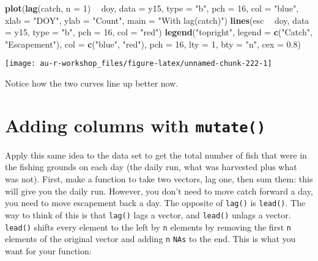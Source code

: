 \documentclass[]{book}
\newenvironment{Shaded}{\begin{snugshade}}{\end{snugshade}}
\newcommand{\KeywordTok}[1]{\textcolor[rgb]{0.13,0.29,0.53}{\textbf{#1}}}
\newcommand{\DataTypeTok}[1]{\textcolor[rgb]{0.13,0.29,0.53}{#1}}
\newcommand{\DecValTok}[1]{\textcolor[rgb]{0.00,0.00,0.81}{#1}}
\newcommand{\FloatTok}[1]{\textcolor[rgb]{0.00,0.00,0.81}{#1}}
\newcommand{\StringTok}[1]{\textcolor[rgb]{0.31,0.60,0.02}{#1}}
\newcommand{\OperatorTok}[1]{\textcolor[rgb]{0.81,0.36,0.00}{\textbf{#1}}}
\newcommand{\NormalTok}[1]{#1}
\theoremstyle{definition}
\theoremstyle{definition}
\theoremstyle{definition}
\theoremstyle{remark}
\begin{document}
\begin{Shaded}
\begin{Highlighting}[]
\KeywordTok{plot}\NormalTok{(}\KeywordTok{lag}\NormalTok{(catch, }\DataTypeTok{n =} \DecValTok{1}\NormalTok{) }\OperatorTok{~}\StringTok{ }\NormalTok{doy, }\DataTypeTok{data =}\NormalTok{ y15, }\DataTypeTok{type =} \StringTok{"b"}\NormalTok{, }\DataTypeTok{pch =} \DecValTok{16}\NormalTok{, }\DataTypeTok{col =} \StringTok{"blue"}\NormalTok{,}
     \DataTypeTok{xlab =} \StringTok{"DOY"}\NormalTok{, }\DataTypeTok{ylab =} \StringTok{"Count"}\NormalTok{, }\DataTypeTok{main =} \StringTok{"With lag(catch)"}\NormalTok{)}
\KeywordTok{lines}\NormalTok{(esc }\OperatorTok{~}\StringTok{ }\NormalTok{doy, }\DataTypeTok{data =}\NormalTok{ y15, }\DataTypeTok{type =} \StringTok{"b"}\NormalTok{, }\DataTypeTok{pch =} \DecValTok{16}\NormalTok{, }\DataTypeTok{col =} \StringTok{"red"}\NormalTok{)}
\KeywordTok{legend}\NormalTok{(}\StringTok{"topright"}\NormalTok{, }\DataTypeTok{legend =} \KeywordTok{c}\NormalTok{(}\StringTok{"Catch"}\NormalTok{, }\StringTok{"Escapement"}\NormalTok{),}
       \DataTypeTok{col =} \KeywordTok{c}\NormalTok{(}\StringTok{"blue"}\NormalTok{, }\StringTok{"red"}\NormalTok{), }\DataTypeTok{pch =} \DecValTok{16}\NormalTok{, }\DataTypeTok{lty =} \DecValTok{1}\NormalTok{, }\DataTypeTok{bty =} \StringTok{"n"}\NormalTok{, }\DataTypeTok{cex =} \FloatTok{0.8}\NormalTok{)}
\end{Highlighting}
\end{Shaded}

\begin{center}\texttt{[image: au-r-workshop\_files/figure-latex/unnamed-chunk-222-1]} \end{center}

Notice how the two curves line up better now.

\section{\texorpdfstring{Adding columns with
\texttt{mutate()}}{Adding columns with mutate()}}\label{adding-columns-with-mutate}

Apply this same idea to the data set to get the total number of fish
that were in the fishing grounds on each day (the daily run, what was
harvested plus what was not). First, make a function to take two
vectors, lag one, then sum them: this will give you the daily run.
However, you don't need to move catch forward a day, you need to move
escapement back a day. The opposite of \texttt{lag()} is
\texttt{lead()}. The way to think of this is that \texttt{lag()} lags a
vector, and \texttt{lead()} unlags a vector. \texttt{lead()} shifts
every element to the left by \texttt{n} elements by removing the first
\texttt{n} elements of the original vector and adding \texttt{n}
\texttt{NAs} to the end. This is what you want for your function:
\end{document}
